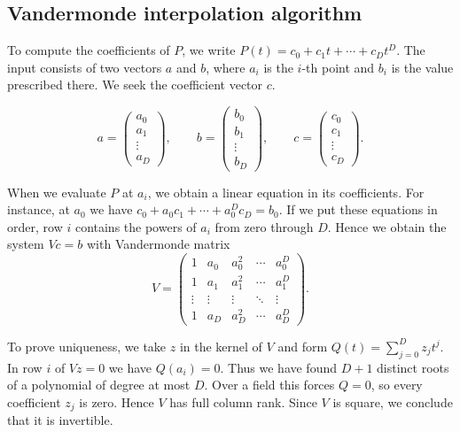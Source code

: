 \documentclass{article}
\theoremstyle{definition}
\begin{document}
\subsection*{Vandermonde interpolation algorithm}\label{alg:vandermonde}

To compute the coefficients of \(P\), we write
\(P(t)=c_0+c_1t+\cdots+c_Dt^D\). The input consists of two vectors
\(a\) and \(b\), where \(a_i\) is the \(i\)-th point and \(b_i\) is
the value prescribed there. We seek the coefficient vector \(c\).

\[
    a=\begin{pmatrix}a_0\\a_1\\\vdots\\a_D\end{pmatrix},\qquad
    b=\begin{pmatrix}b_0\\b_1\\\vdots\\b_D\end{pmatrix},\qquad
    c=\begin{pmatrix}c_0\\c_1\\\vdots\\c_D\end{pmatrix}.
\]

When we evaluate \(P\) at \(a_i\), we obtain a linear equation in its
coefficients. For instance, at \(a_0\) we have
\(c_0+a_0c_1+\cdots+a_0^Dc_D=b_0\). If we put these equations
in order, row \(i\) contains the powers of \(a_i\) from zero through
\(D\). Hence we obtain the system \(Vc=b\) with Vandermonde matrix
\[
    V=\begin{pmatrix}
        1 & a_0 & a_0^2 & \cdots & a_0^D\\
        1 & a_1 & a_1^2 & \cdots & a_1^D\\
        \vdots & \vdots & \vdots & \ddots & \vdots\\
        1 & a_D & a_D^2 & \cdots & a_D^D
    \end{pmatrix}.
\]

To prove uniqueness, we take \(z\) in the
kernel of \(V\) and form \(Q(t)=\sum_{j=0}^D z_jt^j\).
In row \(i\) of \(Vz=0\) we have \(Q(a_i)=0\).
Thus we have found \(D+1\) distinct roots of a polynomial of degree
at most \(D\). Over a field this forces \(Q=0\), so every coefficient
\(z_j\) is zero. Hence \(V\) has full column rank. Since \(V\) is
square, we conclude that it is invertible.
\end{document}
